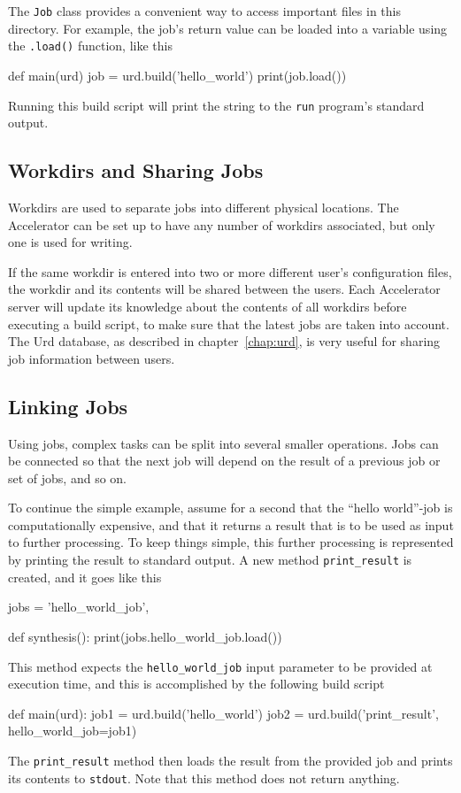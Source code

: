 The \texttt{Job} class provides a convenient way to access important
files in this directory.  For example, the job's return value can be
loaded into a variable using the \texttt{.load()} function, like this
\begin{python}
def main(urd)
    job = urd.build('hello_world')
    print(job.load())
\end{python}
Running this build script will print the string to the \texttt{run}
program's standard output.



\subsection{Workdirs and Sharing Jobs}

Workdirs are used to separate jobs into different physical locations.
The Accelerator can be set up to have any number of workdirs
associated, but only one is used for writing.

If the same workdir is entered into two or more different user's
configuration files, the workdir and its contents will be shared
between the users.  Each Accelerator server will update its knowledge
about the contents of all workdirs before executing a build script, to
make sure that the latest jobs are taken into account.  The Urd
database, as described in chapter~\ref{chap:urd}, is very useful for
sharing job information between users.


\subsection{Linking Jobs}

Using jobs, complex tasks can be split into several smaller
operations.  Jobs can be connected so that the next job will depend on
the result of a previous job or set of jobs, and so on.

To continue the simple example, assume for a second that the ``hello
world''-job is computationally expensive, and that it returns a result
that is to be used as input to further processing.  To keep things
simple, this further processing is represented by printing the result
to standard output.  A new method \texttt{print\_result} is created,
and it goes like this
\begin{python}
jobs = {'hello_world_job',}

def synthesis():
    print(jobs.hello_world_job.load())
\end{python}
This method expects the \texttt{hello\_world\_job} input parameter to
be provided at execution time, and this is accomplished by the
following build script
\begin{python}
def main(urd):
    job1 = urd.build('hello_world')
    job2 = urd.build('print_result', hello_world_job=job1)
\end{python}
The \texttt{print\_result} method then loads the result from the
provided job and prints its contents to \texttt{stdout}.  Note that
this method does not return anything.

